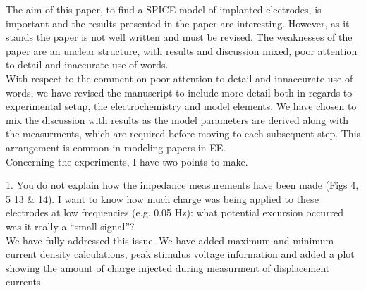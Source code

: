 \documentclass[journal, a4paper]{IEEEtran}
\begin{document}
{\color{blue} The aim of this paper, to find a SPICE model of implanted electrodes, is important and the results presented in the paper are interesting. However, as it stands the paper is not well written and must be revised. The weaknesses of the paper are an unclear structure, with results and discussion mixed, poor attention to detail and inaccurate use of words.\\
{\color{OliveGreen}With respect to the comment on poor attention to detail and innaccurate use of words, we have revised the manuscript to include more detail both in regards to experimental setup, the electrochemistry and model elements. We have chosen to mix the discussion with results as the model parameters are derived along with the measurments, which are required before moving to each subsequent step. This arrangement is common in modeling papers in EE.}\\

Concerning the experiments, I have two points to make.

1. You do not explain how the impedance measurements have been made (Figs 4, 5 13 \& 14). I want to know how much charge was being applied to these electrodes at low frequencies (e.g. 0.05 Hz): what potential excursion occurred was it really a ``small signal''?\\
{\color{OliveGreen}We have fully addressed this issue. We have added maximum and minimum current density calculations, peak stimulus voltage information and added a plot showing the amount of charge injected during measurment of displacement currents.}\\


}
\end{document}
